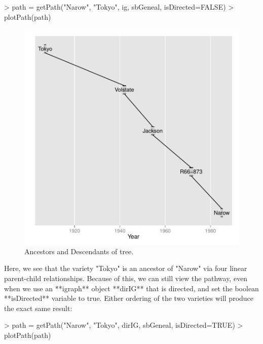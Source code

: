 \documentclass{article}
\numberwithin{equation}{section} %
\begin{document}
\begin{Schunk}
\begin{Sinput}
> path = getPath("Narow", "Tokyo", ig, sbGeneal, isDirected=FALSE)
> plotPath(path)
\end{Sinput}
\end{Schunk}

\begin{figure} 
  \begin{center} 
\includegraphics{ggenealogy-plotPath2}
\end{center} 
\caption{Ancestors and Descendants of tree.}
\label{fig:plotPath2}
\end{figure}

Here, we see that the variety "Tokyo" is an ancestor of "Narow" via four linear parent-child relationships. Because of this, we can still view the pathway, even when we use an **igraph** object **dirIG** that is directed, and set the boolean **isDirected** variable to true. Either ordering of the two varieties will produce the exact same result:

\begin{Schunk}
\begin{Sinput}
> path = getPath("Narow", "Tokyo", dirIG, sbGeneal, isDirected=TRUE)
> plotPath(path)
\end{Sinput}
\end{Schunk}
\end{document}
